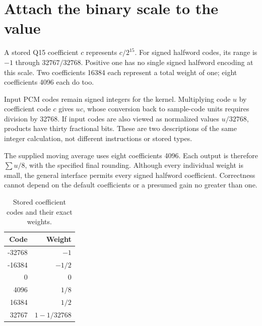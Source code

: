 \section{Attach the binary scale to the value}
A stored Q15 coefficient \(c\) represents \(c/2^{15}\). For signed halfword codes,
its range is \(-1\) through \(32767/32768\). Positive one has no single signed
halfword encoding at this scale. Two coefficients 16384 each represent a total
weight of one; eight coefficients 4096 each do too.

Input PCM codes remain signed integers for the kernel. Multiplying code \(u\) by
coefficient code \(c\) gives \(uc\), whose conversion back to sample-code units
requires division by 32768. If input codes are also viewed as normalized values
\(u/32768\), products have thirty fractional bits. These are two descriptions of
the same integer calculation, not different instructions or stored types.

The supplied moving average uses eight coefficients 4096. Each output is therefore
\(\sum u/8\), with the specified final rounding. Although every individual weight
is small, the general interface permits every signed halfword coefficient. Correctness
cannot depend on the default coefficients or a presumed gain no greater than one.

\begin{table}[htbp]
  \centering
  \caption{Stored coefficient codes and their exact weights.}
  \begin{tabular}{rr}
    \toprule
    Code   & Weight        \\
    \midrule
    -32768 & \(-1\)        \\
    -16384 & \(-1/2\)      \\
    0      & \(0\)         \\
    4096   & \(1/8\)       \\
    16384  & \(1/2\)       \\
    32767  & \(1-1/32768\) \\
    \bottomrule
  \end{tabular}
\end{table}
